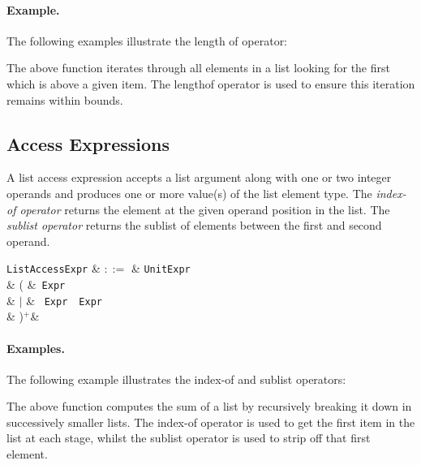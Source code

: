 \paragraph{Example.} The following examples illustrate the length of operator:



The above function iterates through all elements in a list looking for the first which is above a given item.  The lengthof operator is used to ensure this iteration remains within bounds.


\subsection{Access Expressions}
\label{c_expr_list_access}

A list access expression accepts a list argument along with one or two integer operands and produces one or more value(s) of the list element type.  The {\em index-of operator} returns the element at the given operand position in the list.  The {\em sublist operator} returns the sublist of elements between the first and second operand.

\begin{syntax}
  \verb+ListAccessExpr+ & $::=$ & \verb+UnitExpr+\\
   &  \big( &\token{[}\ \verb+Expr+\ \token{]}\\
   & $|$ & \token{[}\ \verb+Expr+\ \ \verb+Expr+\ \token{]}\\
   & \big)$^+$&\\
\end{syntax}

\paragraph{Examples.} The following example illustrates the index-of and sublist operators:



The above function computes the sum of a list by recursively breaking it down in successively smaller lists.  The index-of operator is used to get the first item in the list at each stage, whilst the sublist operator is used to strip off that first element. 

